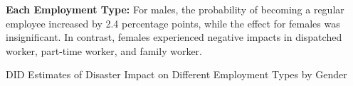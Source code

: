 \documentclass[serif, aspectratio=169]{beamer}
\begin{document}
\begin{frame}[label=different_types]






\textbf{Each Employment Type:} For males, the probability of becoming a regular employee increased by 2.4 percentage points, while the effect for females was insignificant. In contrast, females experienced negative impacts in dispatched worker, part-time worker, and family worker.

\vspace{-0.20cm}

\begin{table}[htbp]
\centering
\caption{DID Estimates of Disaster Impact on Different Employment Types by Gender}

\vspace{-0.5cm}


\end{table}
\end{frame}
\end{document}
